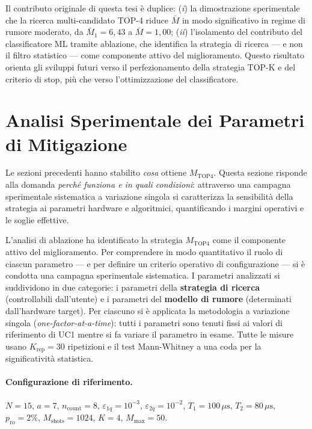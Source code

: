 \begin{onehalfspace}
Il contributo originale di questa tesi è duplice: (\textit{i}) la dimostrazione sperimentale che la ricerca multi-candidato TOP-4 riduce $\bar{M}$ in modo significativo in regime di rumore moderato, da $\bar{M}_1 = 6{,}43$ a $\bar{M} = 1{,}00$; (\textit{ii}) l'isolamento del contributo del classificatore ML tramite ablazione, che identifica la strategia di ricerca --- e non il filtro statistico --- come componente attivo del miglioramento. Questo risultato orienta gli sviluppi futuri verso il perfezionamento della strategia TOP-K e del criterio di stop, più che verso l'ottimizzazione del classificatore.


\section{Analisi Sperimentale dei Parametri di Mitigazione}
\label{sec:parametri_mitigazione}

Le sezioni precedenti hanno stabilito \textit{cosa} ottiene $M_{\text{TOP4}}$. Questa sezione risponde alla domanda \textit{perché funziona e in quali condizioni}: attraverso una campagna sperimentale sistematica a variazione singola si caratterizza la sensibilità della strategia ai parametri hardware e algoritmici, quantificando i margini operativi e le soglie effettive.

L'analisi di ablazione ha identificato la strategia $M_{\text{TOP4}}$ come il componente attivo del miglioramento. Per comprendere in modo quantitativo il ruolo di ciascun parametro — e per definire un criterio operativo di configurazione — si è condotta una campagna sperimentale sistematica. I parametri analizzati si suddividono in due categorie: i parametri della \textbf{strategia di ricerca} (controllabili dall'utente) e i parametri del \textbf{modello di rumore} (determinati dall'hardware target). Per ciascuno si è applicata la metodologia a variazione singola (\textit{one-factor-at-a-time}): tutti i parametri sono tenuti fissi ai valori di riferimento di UC1 mentre si fa variare il parametro in esame. Tutte le misure usano $K_{\text{rep}} = 30$ ripetizioni e il test Mann-Whitney a una coda per la significatività statistica.

\paragraph{Configurazione di riferimento.}
$N=15$, $a=7$, $n_{\text{count}}=8$, $\varepsilon_{1q}=10^{-3}$, $\varepsilon_{2q}=10^{-2}$, $T_1=100\,\mu\text{s}$, $T_2=80\,\mu\text{s}$, $p_{\text{ro}}=2\%$, $M_{\text{shots}}=1024$, $K=4$, $M_{\text{max}}=50$.


\end{onehalfspace}
